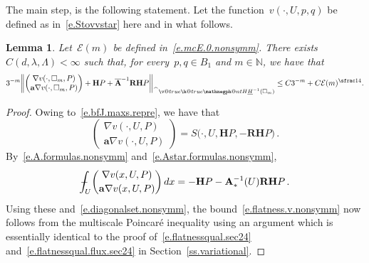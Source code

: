 \documentclass[11pt]{article} %
\makeatletter
\let\oldsquare\square %
\renewcommand{\square}{\oldsquare}
\numberwithin{equation}{section}
\newtheorem{lemma}[theorem]{Lemma}
\theoremstyle{definition}
\let\originalleft\left
\let\originalright\right
\renewcommand{\left}{\mathopen{}\mathclose\bgroup\originalleft}
\renewcommand{\right}{\aftergroup\egroup\originalright}
\newcommand*{\N}{\ensuremath{\mathbb{N}}}
\renewcommand*{\hat}{\widehat}
\renewcommand{\a}{\mathbf{a}}
\newcommand{\cu}{\square}
\def\Xint#1{\mathchoice
{\XXint\displaystyle\textstyle{#1}}%
{\XXint\textstyle\scriptstyle{#1}}%
{\XXint\scriptstyle\scriptscriptstyle{#1}}%
{\XXint\scriptscriptstyle\scriptscriptstyle{#1}}%
\!\int}
\def\XXint#1#2#3{{\setbox0=\hbox{$#1{#2#3}{\int}$}
\vcenter{\hbox{$#2#3$}}\kern-.5\wd0}}
\def\fint{\Xint-}
\newcommand{\negphantom}{\v@true\h@true\negph@nt}
\newcommand{\negph@nt}{\ifmmode\expandafter\mathpalette 
  \expandafter\mathnegph@nt\else\expandafter\makenegph@nt\fi}
\newcommand{\makenegph@nt}[1]{%
  \setbox\z@\hbox{\color@begingroup#1\color@endgroup}\finnegph@nt}
\newcommand{\finnegph@nt}{%
  \setbox\tw@\null 
  \ifv@ \ht\tw@\ht\z@\dp\tw@\dp\z@\fi \ifh@\wd\tw@-\wd\z@\fi\box\tw@}
\newcommand{\mathnegph@nt}[2]{%
  \setbox\z@\hbox{$\m@th #1{#2}$}\finnegph@nt}
\newcommand{\Hminusul}{\hat{\phantom{H}}\negphantom{H}\underline{H}^{-1}}
\newcommand{\bfA}{\mathbf{A}}
\newcommand{\rota}{\mathbf{R}}
\newcommand{\refl}{\mathbf{H}}
\makeatother
\begin{document}
\smallskip

The main step, is the following statement. Let the function~$v(\cdot,U,p,q)$ be defined as in~\eqref{e.Stovvstar} here and in what follows. 

\begin{lemma}
\label{l.flatness.v.nonsymm} 
Let~$\mathcal{E}(m)$ be defined in~\eqref{e.mcE.0.nonsymm}.
There exists $C(d,\lambda,\Lambda)<\infty$ such that, for 
every~$p,q\in B_1$ and $m\in\N$, we have that
\begin{equation}
\label{e.flatness.v.nonsymm}
3^{-m}\left\| 
\begin{pmatrix}
\nabla v(\cdot,\cu_m,P)
\\
\a \nabla v(\cdot,\cu_m,P)
\end{pmatrix}
+ \refl P + \overline{\bfA}^{-1} \rota \refl P
\right\|_{\Hminusul(\cu_m)}
\leq
C3^{-m}
+
C\mathcal{E} (m)^{\sfrac14}.
\end{equation}
\end{lemma}
\begin{proof}
Owing to~\eqref{e.bfJ.maxs.repre}, we have that 
\begin{equation}
\begin{pmatrix} \nabla v(\cdot,U,P) \\ \a \nabla v(\cdot,U,P) \end{pmatrix} 
 =
 S\bigl(\cdot,U,\refl P,  - \rota \refl P \bigr)
\,.
\end{equation}
By~\eqref{e.A.formulas.nonsymm} and~\eqref{e.Astar.formulas.nonsymm}, 
\begin{align*}
\fint_{U} 
\begin{pmatrix} 
\nabla v (x,U,P)
\vspace{0.2em} \\ 
\a \nabla v (x,U,P)
\end{pmatrix}
\,dx
=
- \refl P
-
\bfA_*^{-1} (U) \rota \refl P
\,.
\end{align*}
Using these and~\eqref{e.diagonalset.nonsymm}, the bound~\eqref{e.flatness.v.nonsymm} now follows from the multiscale Poincar\'e inequality using an argument which is essentially identical to the proof 
of~\eqref{e.flatnessqual.sec24} and~\eqref{e.flatnessqual.flux.sec24} in Section~\ref{ss.variational}. 
\end{proof}
\end{document}
